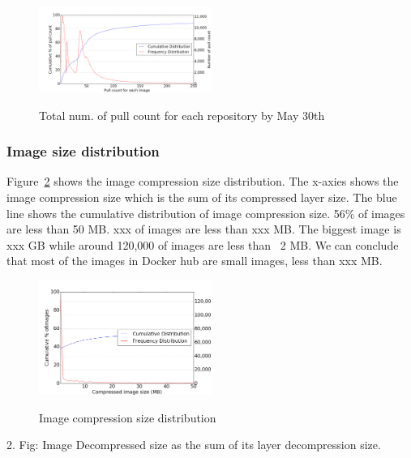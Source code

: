 \begin{figure}
	\centering
	\includegraphics[width=0.5\textwidth]{graphs/Pull_count_for_each_image.png}\\
	\caption{Total num. of pull count for each repository by May 30th}\label{fig_pull_cnt_total}
\end{figure}


\subsubsection{Image size distribution}

Figure~\ref{fig_image_size_compression} shows the image compression size distribution. The x-axies shows the image compression size which is the sum of its compressed layer size. The blue line shows the cumulative distribution of image compression size. 56\% of images are less than 50 MB. xxx of images are less than xxx MB. The biggest image is xxx GB while around 120,000 of images are less than ~2 MB. We can conclude that most of the images in Docker hub are small images, less than xxx MB.

\begin{figure}
	\centering
	\includegraphics[width=0.5\textwidth]{graphs/Compressed_image_size_(MB)}\\
	\caption{Image compression size distribution}\label{fig_image_size_compression}
\end{figure}

2. Fig: Image Decompressed size as the sum of its layer decompression size.

